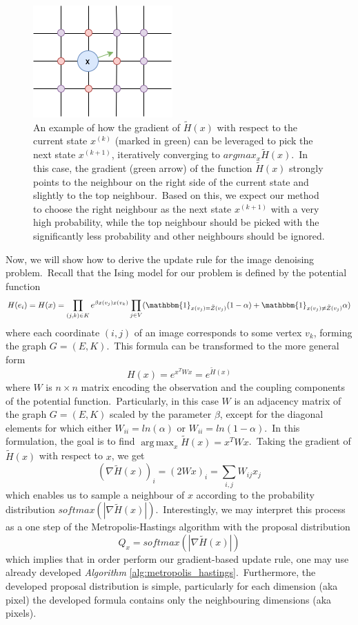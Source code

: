 \documentclass[shortabstract, english, lic]{iithesis}
\DeclareMathOperator*{\argmax}{arg\,max}
\theoremstyle{default_theorem_style}\newtheorem{theorem}{Theorem}
\theoremstyle{default_theorem_style}\newtheorem{definition}{Definition}
\begin{document}
\begin{figure}[t]
\centering
\includegraphics[scale=0.9]{gradient_example}
\caption{An example of how the gradient of $\tilde{H}(x)$ with respect to the current state $x^{(k)}$ (marked in green)
can be leveraged to pick the next state $x^{(k + 1)}$, iteratively converging to $argmax_x \tilde{H}(x)$.\ In this
case, the gradient (green arrow) of the function $\tilde{H}(x)$ strongly points to the neighbour on the right side
of the current state and slightly to the top neighbour.\ Based on this, we expect our method to choose the right
neighbour as the next state $x^{(k + 1)}$ with a very high probability, while the top neighbour should be picked with
the significantly less probability and other neighbours should be ignored.}
\label{fig:gradient_example}
\end{figure}

\noindent Now, we will show how to derive the update rule for the image denoising problem.\ Recall that the Ising model
for our problem is defined by the potential function
$$
H(e_i) = H(x) = \prod\limits_{(j, k) \in K} e^{\beta x(v_j)x(v_k)}
\prod\limits_{j \in V}( \mathbbm{1}_{x(v_j) = \tilde{Z}(v_j)}(1 - \alpha) +
\mathbbm{1}_{x(v_j) \neq \tilde{Z}(v_j)}\alpha)
$$
where each coordinate $(i, j)$ of an image corresponds to some vertex $v_k$, forming the graph $G = (E, K)$.\ This
formula can be transformed to the more general form
$$
H(x) = e^{x^T W x} = e^{\tilde{H}(x)}
$$
where $W$ is $n \times n$ matrix encoding the observation and the coupling components of the potential
function.\ Particularly, in this case $W$ is an adjacency matrix of the graph $G = (E, K)$ scaled by the parameter
$\beta$, except for the diagonal elements for which either $W_{ii} = ln(\alpha)$ or $W_{ii} = ln(1 - \alpha)$.\ In
this formulation, the goal is to find $\argmax_x \tilde{H}(x) = x^T W x$.\ Taking the gradient of
$\tilde{H}(x)$ with respect to $x$, we get
$$
(\nabla \tilde{H}(x))_i = (2W x)_i = \sum_{i, j} W_{ij} x_j
$$
which enables us to sample a neighbour of $x$ according to the probability distribution
$softmax(|\nabla \tilde{H}(x)|)$.\ Interestingly, we may interpret this process as a one step of the
Metropolis-Hastings algorithm with the proposal distribution
$$
Q_x = softmax(|\nabla \tilde{H}(x)|)
$$
which implies that in order perform our gradient-based update rule, one may use already developed
\textit{Algorithm} \ref{alg:metropolis_hastings}.\ Furthermore, the developed proposal distribution is simple,
particularly for each dimension (aka pixel) the developed formula contains only the neighbouring
dimensions (aka pixels).
\end{document}

